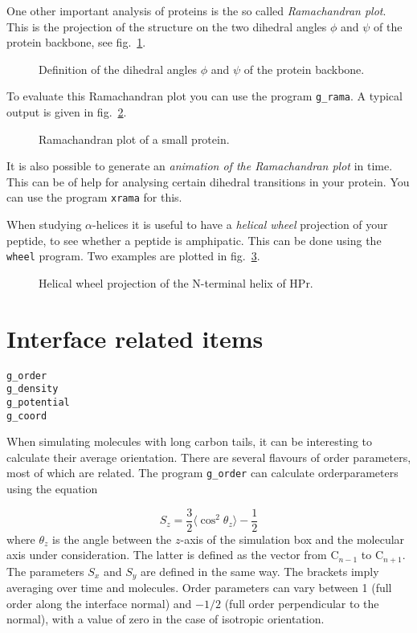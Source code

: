 One other important analysis of proteins is the so called 
{\em Ramachandran plot}. 
This is the projection of the structure on the two dihedral angles $\phi$ and 
$\psi$ of the protein backbone, see fig.~\ref{fig:phipsi}.
%
\begin{figure}
\centerline{
}
\caption{Definition of the dihedral angles $\phi$ and $\psi$ of the protein backbone.}
\label{fig:phipsi}
\end{figure}
%
To evaluate this Ramachandran plot you can use the program {\tt g\_rama}. 
A typical output is given in fig.~\ref{fig:rama}.
%
\begin{figure}
\centerline{
{}}
\caption{Ramachandran plot of a small protein.}
\label{fig:rama}
\end{figure}
%

It is also possible to generate an {\em animation of the Ramachandran plot} 
in time. This can be of help for analysing certain dihedral transitions 
in your protein. You can use the program {\tt xrama} for this.

%
When studying $\alpha$-helices 
it is useful to have a {\em helical wheel} projection
of your peptide, to see whether a peptide is amphipatic. This can be done
using the {\tt wheel} program. Two examples are 
plotted in fig.~\ref{fig:wheel}.
%
\begin{figure}
\centerline{}
\caption{Helical wheel projection of the N-terminal helix of HPr.}
\label{fig:wheel}
\end{figure}


%
\section{Interface related items}
\begin{verbatim}
g_order
g_density
g_potential
g_coord
\end{verbatim}

When simulating molecules with long carbon tails, it can be
interesting to calculate their average orientation. There are several
flavours of order parameters, most of which are related. The program
{\tt g\_order} can calculate orderparameters using the equation

\begin{equation}
S_{z} = \frac{3}{2}\langle {\cos^2{\theta_z}} \rangle - \frac{1}{2}
\label{eq:Sgr}
\end{equation}
where $\theta_z$ is the angle between the $z$-axis of the simulation
box and the molecular axis under consideration. The latter is defined as the
vector from C$_{n-1}$ to C$_{n+1}$. The parameters $S_x$
and $S_y$ are defined in the same way. The brackets imply averaging over time
and molecules. Order parameters can vary between 1 (full order along
the interface normal) and $-1/2$ (full order perpendicular to the
normal), with a value of zero in the case of isotropic orientation.

